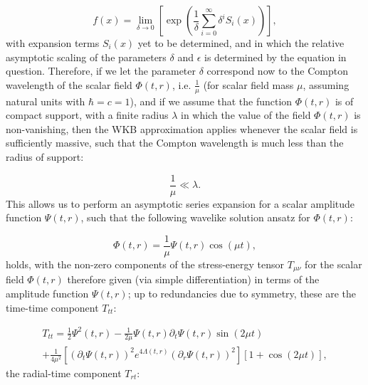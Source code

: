 \documentclass{article}
\begin{document}
\begin{equation}
f \left( x \right) = \lim_{\delta \to 0} \left[ \exp \left( \frac{1}{\delta} \sum_{i = 0}^{\infty} \delta^i S_i \left( x \right) \right) \right],
\end{equation}
with expansion terms ${S_i \left( x \right)}$ yet to be determined, and in which the relative asymptotic scaling of the parameters ${\delta}$ and ${\epsilon}$ is determined by the equation in question. Therefore, if we let the parameter ${\delta}$ correspond now to the Compton wavelength of the scalar field ${\Phi \left( t, r \right)}$, i.e. ${\frac{1}{\mu}}$ (for scalar field mass ${\mu}$, assuming natural units with ${\hbar = c = 1}$), and if we assume that the function ${\Phi \left( t, r \right)}$ is of compact support, with a finite radius ${\lambda}$ in which the value of the field ${\Phi \left( t, r \right)}$ is non-vanishing, then the WKB approximation applies whenever the scalar field is sufficiently massive, such that the Compton wavelength is much less than the radius of support:

\begin{equation}
\frac{1}{\mu} \ll \lambda.
\end{equation}
This allows us to perform an asymptotic series expansion for a scalar amplitude function ${\Psi \left( t, r \right)}$, such that the following wavelike solution ansatz for ${\Phi \left( t, r \right)}$:

\begin{equation}
\Phi \left( t, r \right) = \frac{1}{\mu} \Psi \left( t, r \right) \cos \left( \mu t \right),
\end{equation}
holds, with the non-zero components of the stress-energy tensor ${T_{\mu \nu}}$ for the scalar field ${\Phi \left( t, r \right)}$ therefore given (via simple differentiation) in terms of the amplitude function ${\Psi \left( t, r \right)}$; up to redundancies due to symmetry, these are the time-time component ${T_{t t}}$:

\begin{multline}
T_{t t} = \frac{1}{2} \Psi^2 \left( t, r \right) - \frac{1}{2 \mu} \Psi \left( t, r \right) \partial_t \Psi \left( t, r \right) \sin \left( 2 \mu t \right)\\
+ \frac{1}{4 \mu^2} \left[ \left( \partial_t \Psi \left( t, r \right) \right)^2 e^{4 \Lambda \left( t, r \right)} \left( \partial_r \Psi \left( t, r \right) \right)^2 \right] \left[ 1 + \cos \left( 2 \mu t \right) \right],
\end{multline}
the radial-time component ${T_{r t}}$:
\end{document}
